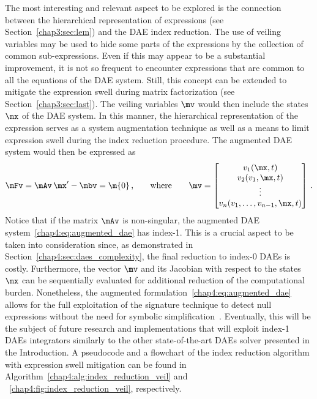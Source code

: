 The most interesting and relevant aspect to be explored is the connection between the hierarchical representation of expressions (see Section~\ref{chap3:sec:lem}) and the \ac{DAE} index reduction. The use of veiling variables may be used to hide some parts of the expressions by the collection of common sub-expressions. Even if this may appear to be a substantial improvement, it is not so frequent to encounter expressions that are common to all the equations of the \ac{DAE} system. Still, this concept can be extended to mitigate the expression swell during matrix factorization (see Section~\ref{chap3:sec:last}). The veiling variables $\mv$ would then include the states $\mx$ of the \ac{DAE} system. In this manner, the hierarchical representation of the expression serves as a system augmentation technique as well as a means to limit expression swell during the index reduction procedure. The augmented \ac{DAE} system would then be expressed as
%
\begin{equation}
  \label{chap4:eq:augmented_dae}
  \mFv = \mAv \, \mx^\prime - \mbv = \m{0} \, \text{,}
  \qquad \text{where} \qquad
  \mv = \begin{bmatrix}
    v_{1}(\mx, t) \\
    v_{2}(v_{1}, \mx, t) \\
    \vdots \\
    v_{n}(v_{1}, \dots, v_{n-1}, \mx, t) \\
  \end{bmatrix} \, \text{.}
\end{equation}
%
Notice that if the matrix $\mAv$ is non-singular, the augmented \ac{DAE} system~\eqref{chap4:eq:augmented_dae} has index-1. This is a crucial aspect to be taken into consideration since, as demonstrated in Section~\ref{chap4:sec:daes_complexity}, the final reduction to index-0 \acp{DAE} is costly. Furthermore, the vector $\mv$ and its Jacobian with respect to the states $\mx$ can be sequentially evaluated for additional reduction of the computational burden. Nonetheless, the augmented formulation~\eqref{chap4:eq:augmented_dae} allows for the full exploitation of the signature technique to detect null expressions without the need for symbolic simplification~\cite{monagan1994signature}. Eventually, this will be the subject of future research and implementations that will exploit index-1 \acp{DAE} integrators similarly to the other state-of-the-art \acp{DAE} solver presented in the Introduction. A pseudocode and a flowchart of the index reduction algorithm with expression swell mitigation can be found in Algorithm~\ref{chap4:alg:index_reduction_veil} and \figurename~\ref{chap4:fig:index_reduction_veil}, respectively.

